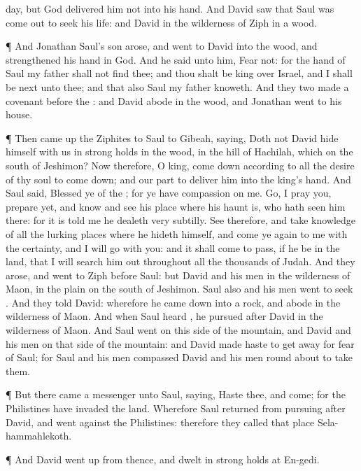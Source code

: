 {day, but
God
delivered him not into his
hand.
And
David
saw that
Saul was come
out to
seek his
life: and
David
{} in the
wilderness of
Ziph in a
wood.
\par }{\PP {}¶ And
Jonathan
Saul’s
son
arose, and
went to
David into the
wood, and
strengthened his
hand in
God.
And he
said unto him,
Fear not: for the
hand of
Saul my
father shall not
find thee; and thou shalt be
king over
Israel, and I shall be
next unto thee; and that also
Saul my
father
knoweth.
And they
two
made a
covenant
before the
{}: and
David
abode in the
wood, and
Jonathan
went to his
house.
\par }{\PP {}¶ Then came
up the
Ziphites to
Saul to
Gibeah,
saying, Doth not
David
hide himself with us in strong
holds in the
wood, in the
hill of
Hachilah, which
{} on the
south of
Jeshimon?
Now therefore, O
king, come
down according to all the
desire of thy
soul to come
down; and our part
{} to
deliver him into the
king’s
hand.
And
Saul
said,
Blessed
{} ye of the
{}; for ye have
compassion on me.
Go, I pray you,
prepare yet, and
know and
see his
place where his
haunt is,
{} who hath
seen him there: for it is
told me
{} he dealeth
very
subtilly.
See therefore, and take
knowledge of all the lurking
places where he
hideth himself, and come ye
again to me with the
certainty, and I will
go with you: and it shall come to pass, if he
be in the
land, that I will
search him out throughout all the
thousands of
Judah.
And they
arose, and
went to
Ziph
before
Saul: but
David and his
men
{} in the
wilderness of
Maon, in the
plain on the
south of
Jeshimon.
Saul also and his
men
went to
seek
{}. And they
told
David: wherefore he came
down into a
rock, and
abode in the
wilderness of
Maon. And when
Saul
heard
{}, he
pursued
after
David in the
wilderness of
Maon.
And
Saul
went on this
side of the
mountain, and
David and his
men on that
side of the
mountain: and
David made
haste to get
away for
fear of
Saul; for
Saul and his
men
compassed
David and his
men round
about to
take them.
\par }{\PP {}¶ But there
came a
messenger unto
Saul,
saying,
Haste thee, and
come; for the
Philistines have
invaded the
land.
Wherefore
Saul
returned from
pursuing
after
David, and
went
against the
Philistines: therefore they
called that
place
Sela-hammahlekoth.
\par }{\PP {}¶ And
David went
up from thence, and
dwelt in strong
holds at
En-gedi.

}
